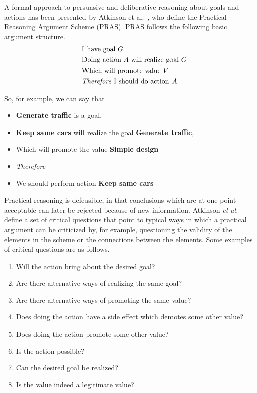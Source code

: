 A formal approach to persuasive and deliberative reasoning about goals and actions has been presented by Atkinson et al.~\cite{atkinson2007}, who define the Practical Reasoning Argument Scheme (PRAS). PRAS follows the following basic argument structure. 
\begin{equation}
\label{eq:eq1}
  \begin{aligned}
 \qquad&\text{I have goal } G&\\
&\text{Doing action }A \text{ will realize goal }G&\\
&\text{Which will promote value }V&\\
&\text{\emph{Therefore} I should do action }A.&
  \end{aligned}
\end{equation}

So, for example, we can say that 
\begin{itemize}
\item[] \textbf{Generate traffic} is a goal,
\item[] \textbf{Keep same cars} will realize the goal \textbf{Generate traffic},
\item[] Which will promote the value \textbf{Simple design}
\item[] \textit{Therefore} 
\item[] We should perform action \textbf{Keep same cars}
\end{itemize}

Practical reasoning is defeasible, in that conclusions which are at one point acceptable can later be rejected because of new information. Atkinson \emph{et al.}~\cite{atkinson2007} define a set of critical questions that point to typical ways in which a practical argument can be criticized by, for example, questioning the validity of the elements in the scheme or the connections between the elements. Some examples of critical questions are as follows.

\begin{enumerate}
\item Will the action bring about the desired goal?
\item Are there alternative ways of realizing the same goal?
\item Are there alternative ways of promoting the same value?
\item Does doing the action have a side effect which demotes some other value?
\item Does doing the action promote some other value?
\item Is the action possible?
\item Can the desired goal be realized?
\item Is the value indeed a legitimate value?
\end{enumerate}

